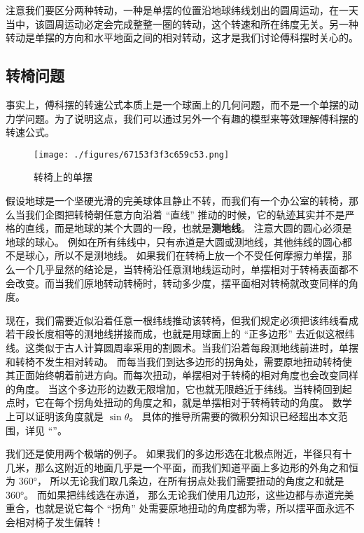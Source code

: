 注意我们要区分两种转动，一种是单摆的位置沿地球纬线划出的圆周运动，在一天当中，该圆周运动必定会完成整整一圈的转动，这个转速和所在纬度无关。另一种转动是单摆的方向和水平地面之间的相对转动，这才是我们讨论傅科摆时关心的。

\subsection{转椅问题}
事实上，傅科摆的转速公式本质上是一个球面上的几何问题，而不是一个单摆的动力学问题。为了说明这点，我们可以通过另外一个有趣的模型来等效理解傅科摆的转速公式。

\begin{figure}[ht]
\centering
\texttt{[image: ./figures/67153f3f3c659c53.png]}
\caption{转椅上的单摆} \label{fig_FouPen_2}
\end{figure}

假设地球是一个坚硬光滑的完美球体且静止不转，而我们有一个办公室的转椅，那么当我们企图把转椅朝任意方向沿着 “直线” 推动的时候，它的轨迹其实并不是严格的直线，而是地球的某个大圆的一段，也就是\textbf{测地线}。 注意大圆的圆心必须是地球的球心。 例如在所有纬线中，只有赤道是大圆或测地线，其他纬线的圆心都不是球心，所以不是测地线。 如果我们在转椅上放一个不受任何摩擦力单摆，那么一个几乎显然的结论是，当转椅沿任意测地线运动时，单摆相对于转椅表面都不会改变。而当我们原地转动转椅时，转动多少度，摆平面相对转椅就改变同样的角度。

现在，我们需要近似沿着任意一根纬线推动该转椅，但我们规定必须把该纬线看成若干段长度相等的测地线拼接而成，也就是用球面上的 “正多边形” 去近似这根纬线。这类似于古人计算圆周率采用的割圆术。当我们沿着每段测地线前进时，单摆和转椅不发生相对转动。 而每当我们到达多边形的拐角处，需要原地扭动转椅使其正面始终朝着前进方向。而每次扭动，单摆相对于转椅的相对角度也会改变同样的角度。 当这个多边形的边数无限增加，它也就无限趋近于纬线。当转椅回到起点时，它在每个拐角处扭动的角度之和，就是单摆相对于转椅转动的角度。 数学上可以证明该角度就是 $\sin\theta$。 具体的推导所需要的微积分知识已经超出本文范围，详见 “”。

我们还是使用两个极端的例子。 如果我们的多边形选在北极点附近，半径只有十几米，那么这附近的地面几乎是一个平面，而我们知道平面上多边形的外角之和恒为 360°， 所以无论我们取几条边，在所有拐点处我们需要扭动的角度之和就是 360°。 而如果把纬线选在赤道， 那么无论我们使用几边形，这些边都与赤道完美重合，也就是说它每个 “拐角” 处需要原地扭动的角度都为零，所以摆平面永远不会相对椅子发生偏转！
